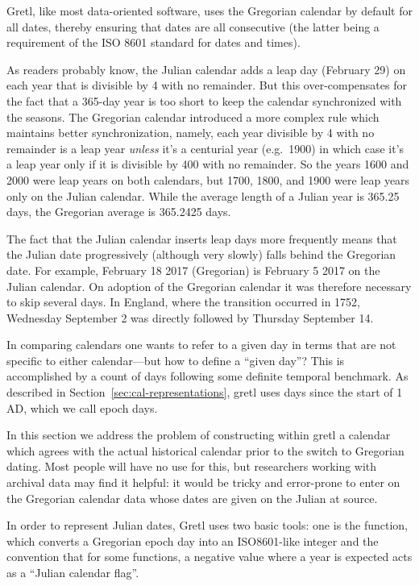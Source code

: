 Gretl, like most data-oriented software, uses the Gregorian calendar
by default for all dates, thereby ensuring that dates are all
consecutive (the latter being a requirement of the ISO 8601 standard
for dates and times).

As readers probably know, the Julian calendar adds a leap day
(February 29) on each year that is divisible by 4 with no
remainder. But this over-compensates for the fact that a 365-day year
is too short to keep the calendar synchronized with the seasons. The
Gregorian calendar introduced a more complex rule which maintains
better synchronization, namely, each year divisible by 4 with no
remainder is a leap year \textit{unless} it's a centurial year (e.g.\
1900) in which case it's a leap year only if it is divisible by 400
with no remainder.  So the years 1600 and 2000 were leap years on both
calendars, but 1700, 1800, and 1900 were leap years only on the Julian
calendar. While the average length of a Julian year is 365.25 days,
the Gregorian average is 365.2425 days. 

The fact that the Julian calendar inserts leap days more frequently
means that the Julian date progressively (although very slowly) falls
behind the Gregorian date. For example, February 18 2017 (Gregorian)
is February 5 2017 on the Julian calendar. On adoption of the
Gregorian calendar it was therefore necessary to skip several days. In
England, where the transition occurred in 1752, Wednesday September 2
was directly followed by Thursday September 14.

In comparing calendars one wants to refer to a given day in terms that
are not specific to either calendar---but how to define a ``given
day''? This is accomplished by a count of days following some definite
temporal benchmark. As described in
Section~\ref{sec:cal-representations}, gretl uses days since the start
of 1 AD, which we call epoch days.

In this section we address the problem of constructing within gretl a
calendar which agrees with the actual historical calendar prior to
the switch to Gregorian dating. Most people will have no use for
this, but researchers working with archival data may find it helpful:
it would be tricky and error-prone to enter on the Gregorian calendar
data whose dates are given on the Julian at source.

In order to represent Julian dates, Gretl uses two basic tools: one is
the \cmd{juldate} function, which converts a Gregorian epoch day into
an ISO8601-like integer and the convention that for some functions,
a negative value where a year is expected acts as a ``Julian calendar
flag''.

